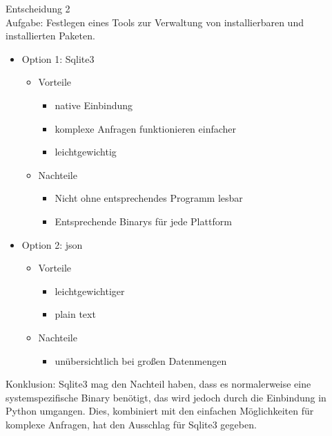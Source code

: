 Entscheidung 2 \\
Aufgabe: Festlegen eines Tools zur Verwaltung von installierbaren und installierten Paketen.

\begin{itemize}
    \item Option 1: Sqlite3
    \begin{itemize}
        \item Vorteile
        \begin{itemize}
            \item native Einbindung
            \item komplexe Anfragen funktionieren einfacher
            \item leichtgewichtig
        \end{itemize}
        \item Nachteile
                
        \begin{itemize}
            \item Nicht ohne entsprechendes Programm lesbar
            \item Entsprechende Binarys für jede Plattform
        \end{itemize}
    \end{itemize}
     \item Option 2: json  
    \begin{itemize}
        \item Vorteile
        \begin{itemize}
            \item leichtgewichtiger
            \item plain text
        \end{itemize}
        \item Nachteile
        \begin{itemize}
            \item unübersichtlich bei großen Datenmengen
        \end{itemize}        
    \end{itemize}
\end{itemize}

Konklusion: Sqlite3 mag den Nachteil haben, dass es normalerweise eine systemspezifische
Binary benötigt, das wird jedoch durch die Einbindung in Python umgangen. Dies, kombiniert
mit den einfachen Möglichkeiten für komplexe Anfragen, hat den Ausschlag für Sqlite3
gegeben.

    